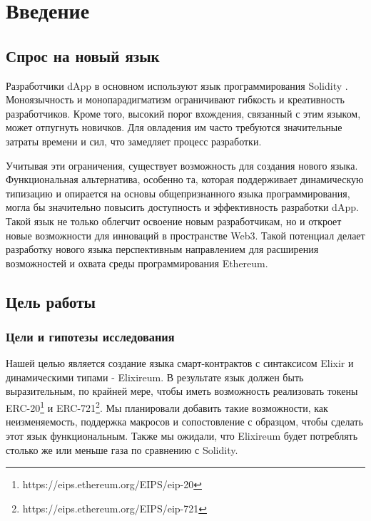 \chapter{Введение}
\label{chap:intro}

\section{Спрос на новый язык}
\label{sec:langdemand}

Разработчики dApp в основном используют язык программирования Solidity \cite{SolidityWidelyUsed, SolidityDevsChallenges}. Моноязычность и монопарадигматизм ограничивают гибкость и креативность разработчиков. Кроме того, высокий порог вхождения, связанный с этим языком, может отпугнуть новичков. Для овладения им часто требуются значительные затраты времени и сил, что замедляет процесс разработки.

Учитывая эти ограничения, существует возможность для создания нового языка. Функциональная альтернатива, особенно та, которая поддерживает динамическую типизацию и опирается на основы общепризнанного языка программирования, могла бы значительно повысить доступность и эффективность разработки dApp. Такой язык не только облегчит освоение новым разработчикам, но и откроет новые возможности для инноваций в пространстве Web3. Такой потенциал делает разработку нового языка перспективным направлением для расширения возможностей и охвата среды программирования Ethereum.

\section{Цель работы}
\label{sec:goal}

\subsection{Цели и гипотезы исследования}
Нашей целью является создание языка смарт-контрактов с синтаксисом Elixir и динамическими типами - Elixireum. В результате язык должен быть выразительным, по крайней мере, чтобы иметь возможность реализовать токены ERC-20\footnote{https://eips.ethereum.org/EIPS/eip-20} и ERC-721\footnote{https://eips.ethereum.org/EIPS/eip-721}. Мы планировали добавить такие возможности, как неизменяемость, поддержка макросов и сопостовление с образцом, чтобы сделать этот язык функциональным. Также мы ожидали, что Elixireum будет потреблять столько же или меньше газа по сравнению с Solidity.

